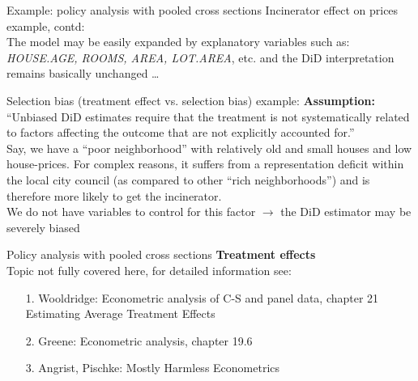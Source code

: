 \documentclass[usenames,dvipsnames]{beamer}
\begin{document}
\begin{frame}{Example: policy analysis with pooled cross sections}
\small
Incinerator effect on prices example, contd: \\
\medskip
The model may be easily expanded by explanatory variables such as: \textit{HOUSE.AGE, ROOMS, AREA, LOT.AREA}, etc. and the DiD interpretation remains basically unchanged \dots
\begin{block}{Selection bias (treatment effect vs. selection bias) example:}
\small
\textbf{Assumption:} “Unbiased DiD estimates require that the treatment is not systematically related to factors affecting the outcome that are not explicitly accounted for.”  \\
\medskip
Say, we have a “poor neighborhood” with relatively old and small houses and low house-prices. For complex reasons, it suffers from a representation deficit within the local city council (as compared to other “rich neighborhoods”) and is therefore more likely to get the incinerator. \\
\medskip
We do not have variables to control for this factor $\rightarrow$ the DiD estimator may be severely biased 
\end{block}
\end{frame}
\begin{frame}{Policy analysis with pooled cross sections}
\textbf{Treatment effects}\\
\medskip
Topic not fully covered here, for detailed information see:\\
\medskip
\begin{itemize}
\item[1.] Wooldridge: Econometric analysis of C-S and panel data, chapter 21 Estimating Average Treatment Effects
\medskip
\item[2.] Greene: Econometric analysis, chapter 19.6
\medskip
\item[3.] Angrist, Pischke: Mostly Harmless Econometrics
\end{itemize}
\end{frame}
\end{document}
